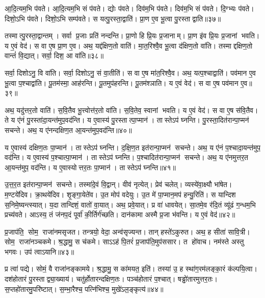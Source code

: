 आ॒दि॒त्यम॒भि प॑वते।
आ॒दि॒त्यम॒भि सं प॑वते।
द्योः प॑वते।
दिव॑म॒भि प॑वते।
दिव॑म॒भि सं प॑वते।
दि॒ग्भ्यः प॑वते।
दिशो॒ऽभि प॑वते।
दिशो॒ऽभि सम्प॑वते।
स यत्पु॒रस्ता॒द्वाति॑।
प्रा॒ण ए॒व भू॒त्वा पु॒रस्ताद्वाति॥३७॥

तस्मात्पु॒रस्ता॒द्वान्तम्।
सर्वा प्र॒जाः प्रति॑ नन्दन्ति।
प्रा॒णो हि प्रि॒यः प्र॒जानाम्।
प्रा॒ण इ॑व प्रि॒यः प्र॒जानां भवति।
य ए॒वं वेद॑।
स वा ए॒ष प्रा॒ण ए॒व।
अथ॒ यद्द॑क्षिण॒तो वाति॑।
मा॒त॒रिश्वै॒व भू॒त्वा द॑क्षिण॒तो वा॑ति।
तस्माद्दक्षिण॒तो वान्तं॑ वि॒द्यात्।
सर्वा॒ दिश॒ आ वा॑ति॥३८॥

सर्वा॒ दिशोऽनु॒ वि वा॑ति।
सर्वा॒ दिशोऽनु॒ सं वा॒तीति॑।
स वा ए॒ष मा॑त॒रिश्वै॒व।
अथ॒ यत्प॒श्चाद्वाति॑।
पव॑मान ए॒व भू॒त्वा प॒श्चाद्वा॑ति।
पू॒तम॑स्मा॒ आह॑रन्ति।
पू॒तमुप॑हरन्ति।
पू॒तम॑श्ञाति।
य ए॒वं वेद॑।
स वा ए॒ष पव॑मान ए॒व॥३९॥

अथ॒ यदु॑त्तर॒तो वाति॑।
स॒वि॒तैव भू॒त्त्वोत्त॑र॒तो वा॑ति।
स॒वि॒तेव॒ स्वानां भवति।
य ए॒वं वेद॑।
स वा ए॒ष स॑वि॒तैव।
ते य ए॑नं पु॒रस्ता॑दा॒यन्त॑मुप॒वद॑न्ति।
य ए॒वास्य॑ पु॒रस्तात्पा॒प्मान॑।
तास्तेऽप॑ घ्नन्ति।
पु॒रस्ता॒दित॑रान्पा॒प्मन॑ सचन्ते।
अथ॒ य ए॑नन्दक्षिण॒त आ॒यन्त॑मुप॒वद॑न्ति॥४०॥

य ए॒वास्य॑ दक्षिण॒तः पा॒प्मान॑।
तास्तेऽप॑ घ्नन्ति।
द॒क्षि॒ण॒त इत॑रान्पा॒प्मन॑ सचन्ते।
अथ॒ य ए॑नं प॒श्चादा॒यन्त॑मुप॒ वद॑न्ति।
य ए॒वास्य॑ प॒श्चात्पा॒प्मान॑।
तास्तेऽप॑ घ्नन्ति।
प॒श्चादित॑रान्पा॒प्मन॑ सचन्ते।
अथ॒ य ए॑नमुत्तर॒त आ॒यन्त॑मुप॒ वद॑न्ति।
य ए॒वास्योत्तर॒तः पा॒प्मान॑।
तास्तेऽप॑ घ्नन्ति॥४१॥

उ॒त्त॒र॒त इत॑रान्पा॒प्मन॑ सचन्ते।
तस्मा॑दे॒वं वि॒द्वान्।
वीव॑ नृत्येत्।
प्रेव॑ चलेत्।
व्यस्ये॑वा॒क्ष्यौ भा॑षेत।
म॒ण्टये॑दिव।
क्रा॒थये॑दिव।
शृ॒ङ्गा॒येते॑व।
उ॒त मोप॑ वदेयुः।
उ॒त मे॑ पा॒प्मान॒मप॑ हन्यु॒रिति॑।
स यान्दिश स॒निमे॒ष्यन्त्स्यात्।
य॒दा तान्दिशं॒ वातो॑ वा॒यात्।
अथ॒ प्रवे॒यात्।
प्र वा॑ धावयेत्।
सा॒तमे॒व र॑दि॒तं व्यू॑ढं ग॒न्धम॒भि प्रच्य॑वते।
आऽस्य॒ तं ज॑नप॒दं पूर्वा॑ की॒र्तिर्ग॑च्छति।
दान॑कामा अस्मै प्र॒जा भ॑वन्ति।
य ए॒वं वेद॑॥४२॥\anuvakamend[वेद॒ सं प॑वत आदि॒त्यात्प॑वते वा॒त्या वात्ये॒ष पव॑मान ए॒व द॑क्षिण॒त आ॒यन्त॑मुप॒ वद॑न्त्युत्तर॒तः पा॒प्मान॒स्ता स्तेप॑ घ्न॒न्तीत्य॒ष्टौ च॑]

प्र॒जाप॑ति॒ सोम॒ राजा॑नमसृजत।
तन्त्रयो॒ वेदा॒ अन्व॑सृज्यन्त।
तान् हस्ते॑ऽकुरुत।
अथ॒ ह सीता॑ सावि॒त्री।
सोम॒ राजा॑नञ्चकमे।
श्र॒द्धामु॒ स च॑कमे।
साऽऽह॑ पि॒तरं॑ प्र॒जाप॑ति॒मुप॑ससार।
त हो॑वाच।
नम॑स्ते अस्तु भगवः।
उप॑ त्वाऽयानि॥४३॥

प्र त्वा॑ पद्ये।
सोमं॒ वै राजा॑नङ्कामये।
श्र॒द्धामु॒ स का॑मयत॒ इति॑।
तस्या॑ उ॒ ह स्था॑ग॒रम॑लङ्का॒रं क॑ल्पयि॒त्वा।
दश॑होतारं पु॒रस्ताद्व्या॒ख्याय॑।
चतु॑र्\mbox{}होतारन्दक्षिण॒तः।
पञ्च॑होतारं प॒श्चात्।
षड्ढो॑तारमुत्तर॒तः।
स॒प्तहो॑तारमु॒परि॑ष्टात्।
स॒म्भा॒रैश्च॒ पत्नि॑भिश्च॒ मुखे॑ऽल॒ङ्कृत्य॑॥४४॥

